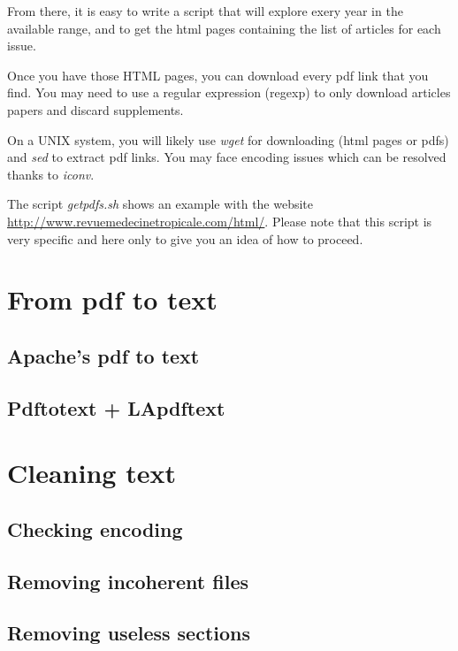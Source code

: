 \documentclass[a4paper,10pt]{article}
\begin{document}
From there, it is easy to write a script that will explore exery year
in the available range, and to get the html pages containing the list
of articles for each issue.

Once you have those HTML pages, you can download every pdf link that
you find. You may need to use a regular expression (regexp) to only
download articles papers and discard supplements.

On a UNIX system, you will likely use \emph{wget} for downloading
(html pages or pdfs) and \emph{sed} to extract pdf links. You may face
encoding issues which can be resolved thanks to \emph{iconv}.

The script \emph{getpdfs.sh} shows an example with the website
\url{http://www.revuemedecinetropicale.com/html/}. Please note that
this script is very specific and here only to give you an idea of how
to proceed.

\section{From pdf to text}
\label{sec:pdftotext}

\subsection{Apache's pdf to text}
\label{sec:apachepdf}

\subsection{Pdftotext + LApdftext}
\label{sec:lapdf}



\section{Cleaning text}
\label{sec:cleaning}

\subsection{Checking encoding}
\label{sec:encoding}

\subsection{Removing incoherent files}
\label{sec:incoherent}



\subsection{Removing useless sections}
\label{sec:removesec}
\end{document}
